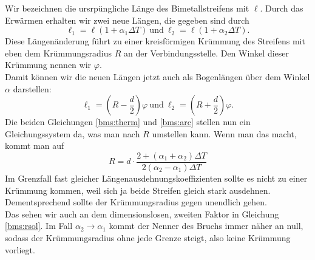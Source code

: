 \begin{Answer}[ref = bms]
\begin{figure}[h]
	\end{figure}
	Wir bezeichnen die ursrpüngliche Länge des Bimetallstreifens mit $\ell$. Durch das Erwärmen erhalten wir zwei neue Längen, die gegeben sind durch
	\begin{equation}\label{bms:therm}
		\ell_1 = \ell\left(1+\alpha_1\Delta T\right) ~\mathrm{und}~\ell_2 = \ell\left(1+\alpha_2 \Delta T\right).
	\end{equation}
	Diese Längenänderung führt zu einer kreisförmigen Krümmung des Streifens mit eben dem Krümmungsradius $R$ an der Verbindungsstelle. Den Winkel dieser Krümmung nennen wir $\varphi$. \\
	Damit können wir die neuen Längen jetzt auch als Bogenlängen über dem Winkel $\alpha$ darstellen:
	\begin{equation}\label{bms:arc}
		\ell_1 = \left(R-\frac{d}{2}\right) \varphi ~\mathrm{und}~\ell_2 = \left(R+\frac{d}{2}\right)\varphi.
	\end{equation}
	Die beiden Gleichungen \eqref{bms:therm} und \eqref{bms:arc} stellen nun ein Gleichungssystem da, was man nach $R$ umstellen kann. Wenn man das macht, kommt man auf
	\begin{equation}\label{bms:rsol}
		\boxed{
			R = d\cdot \frac{2+\left(\alpha_1 + \alpha_2\right) \Delta T}{2\left(\alpha_2 - \alpha_1\right)\Delta T}
			}
	\end{equation}
	Im Grenzfall fast gleicher Längenausdehnungskoeffizienten sollte es nicht zu einer Krümmung kommen, weil sich ja beide Streifen gleich stark ausdehnen. Dementsprechend sollte der Krümmungsradius gegen unendlich gehen.\\
	Das sehen wir auch an dem dimensionslosen, zweiten Faktor in Gleichung \eqref{bms:rsol}. Im Fall $\alpha_2\rightarrow \alpha_1$ kommt der Nenner des Bruchs immer näher an null, sodass der Krümmungsradius ohne jede Grenze steigt, also keine Krümmung vorliegt.
\end{Answer}